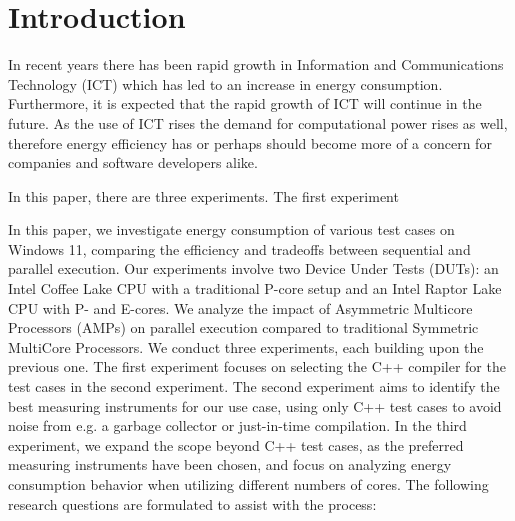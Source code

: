 \section{Introduction}

In recent years there has been rapid growth in Information and Communications Technology (ICT) which has led to an increase in energy consumption. Furthermore, it is expected that the rapid growth of ICT will continue in the future. \cite{jones2018stop,andrae2015global} As the use of ICT rises the demand for computational power rises as well, therefore energy efficiency has or perhaps should become more of a concern for companies and software developers alike.

In this paper, there are three experiments. The first experiment 

In this paper, we investigate energy consumption of various test cases on Windows 11, comparing the efficiency and tradeoffs between sequential and parallel execution. Our experiments involve two Device Under Tests (DUTs): an Intel Coffee Lake CPU with a traditional P-core setup and an Intel Raptor Lake CPU with P- and E-cores. We analyze the impact of Asymmetric Multicore Processors (AMPs) on parallel execution compared to traditional Symmetric MultiCore Processors. We conduct three experiments, each building upon the previous one. The first experiment focuses on selecting the C++ compiler for the test cases in the second experiment. The second experiment aims to identify the best measuring instruments for our use case, using only C++ test cases to avoid noise from e.g. a garbage collector or just-in-time compilation. In the third experiment, we expand the scope beyond C++ test cases, as the preferred measuring instruments have been chosen, and focus on analyzing energy consumption behavior when utilizing different numbers of cores. The following research questions are formulated to assist with the process:

